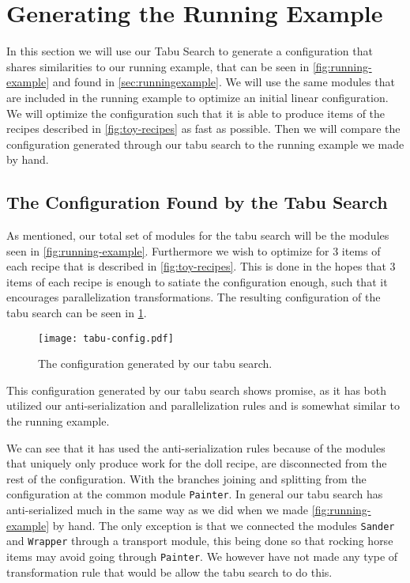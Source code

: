 \section{Generating the Running Example}
In this section we will use our Tabu Search to generate a configuration that shares similarities to our running example, that can be seen in \cref{fig:running-example} and found in \cref{sec:runningexample}. We will use the same modules that are included in the running example to optimize an initial linear configuration. We will optimize the configuration such that it is able to produce items of the recipes described in \cref{fig:toy-recipes} as fast as possible. Then we will compare the configuration generated through our tabu search to the running example we made by hand.

\subsection{The Configuration Found by the Tabu Search}
As mentioned, our total set of modules for the tabu search will be the modules seen in \cref{fig:running-example}. Furthermore we wish to optimize for 3 items of each recipe that is described in \cref{fig:toy-recipes}. This is done in the hopes that 3 items of each recipe is enough to satiate the configuration enough, such that it encourages parallelization transformations. The resulting configuration of the tabu search can be seen in \cref{fig:tabu-config}.

\begin{figure}[H]
	\centering
	\texttt{[image: tabu-config.pdf]}
	\caption{The configuration generated by our tabu search.}
	\label{fig:tabu-config}
\end{figure}

This configuration generated by our tabu search shows promise, as it has both utilized our anti-serialization and parallelization rules and is somewhat similar to the running example. 

We can see that it has used the anti-serialization rules because of the modules that uniquely only produce work for the doll recipe, are disconnected from the rest of the configuration. With the branches joining and splitting from the configuration at the common module \texttt{Painter}. In general our tabu search has anti-serialized much in the same way as we did when we made \cref{fig:running-example} by hand. The only exception is that we connected the modules \texttt{Sander} and \texttt{Wrapper} through a transport module, this being done so that rocking horse items may avoid going through \texttt{Painter}. We however have not made any type of transformation rule that would be allow the tabu search to do this. 

